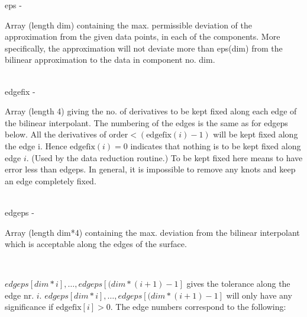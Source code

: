         \>\>    {\fov eps}\> - \>       \begin{minipg2}
                                Array (length dim) containing the max. permissible
                                deviation of the approximation from the given data
                                points, in each of the components. More specifically, the
                                approximation will not deviate more than eps(dim)
                                from the bilinear
                                approximation to the data in component no. dim.
                                \end{minipg2}\\[0.3ex]
        \>\>    {\fov edgefix}\> - \>   \begin{minipg2}
                                Array (length 4) giving the no. of derivatives to be
                                kept fixed along each edge of the bilinear interpolant.
                                The numbering of the edges is the same as for edgeps
                                below. All the derivatives of
                                $\mbox{order}<(\mbox{edgefix}(i)-1)$ will be
                                kept fixed along the edge i.
                                Hence $\mbox{edgefix}(i)=0$ indicates
                                that nothing is to be kept fixed along edge $i$. (Used by the
                                data reduction routine.)
                                To be kept fixed here means to have error less than
                                edgeps. In general, it is impossible to remove any knots
                                and keep an edge completely fixed.
                                \end{minipg2}\\[0.3ex]
        \>\>    {\fov edgeps}\> - \>    \begin{minipg2}
                                Array (length dim*4) containing the max. deviation
                                from the bilinear interpolant which is acceptable along
                                the edges of the surface.
                                \end{minipg2}\\[0.3ex]
                \>\>\>\>        \begin{minipg2}
                                $edgeps[dim*i],\ldots,edgeps[(dim*(i+1)-1]$
                                gives the
                                tolerance along the edge nr. $i$.
                                $edgeps[dim*i],\ldots,edgeps[(dim*(i+1)-1]$
                                will only have any significance if
                                $\mbox{edgefix}[i]>0$.
                                The edge numbers correspond to the
                                following:
                                \end{minipg2}\\
